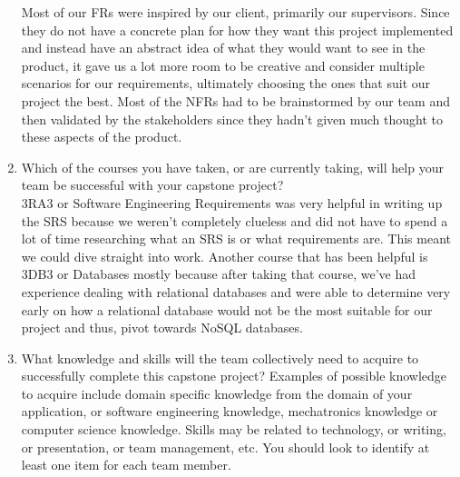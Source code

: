 \documentclass[12pt]{article}
\begin{document}
\begin{enumerate}
  Most of our FRs were inspired by our client, primarily our supervisors. Since they do not have a concrete plan for how they want this project implemented
  and instead have an abstract idea of what they would want to see in the product, it gave us a lot more room to be creative and consider multiple scenarios
  for our requirements, ultimately choosing the ones that suit our project the best. Most of the NFRs had to be brainstormed by our team and then validated by
  the stakeholders since they hadn't given much thought to these aspects of the product.
  \item Which of the courses you have taken, or are currently taking, will help your team be successful with your capstone project?\\

  3RA3 or Software Engineering Requirements was very helpful in writing up the SRS because we weren't completely clueless and did not have to spend a lot of time
  researching what an SRS is or what requirements are. This meant we could dive straight into work. Another course that has been helpful is 3DB3 or Databases mostly
  because after taking that course, we've had experience dealing with relational databases and were able to determine very early on how a relational database would
  not be the most suitable for our project and thus, pivot towards NoSQL databases.
  \item What knowledge and skills will the team collectively need to acquire to
  successfully complete this capstone project?  Examples of possible knowledge
  to acquire include domain specific knowledge from the domain of your
  application, or software engineering knowledge, mechatronics knowledge or
  computer science knowledge.  Skills may be related to technology, or writing,
  or presentation, or team management, etc.  You should look to identify at
  least one item for each team member.\\


\end{enumerate}
\end{document}
